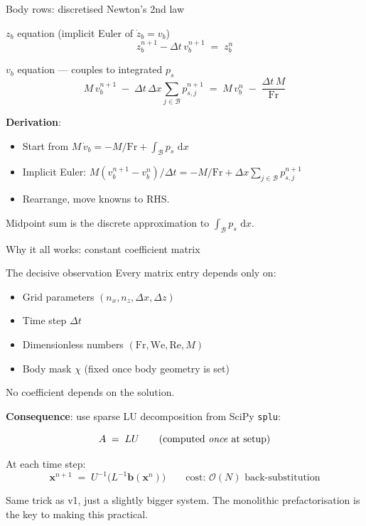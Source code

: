 \documentclass[aspectratio=169, 10pt]{beamer}
\newcommand{\Fr}{\mathrm{Fr}}
\newcommand{\We}{\mathrm{We}}
\newcommand{\Rey}{\mathrm{Re}}
\newcommand{\xx}{\mathbf{x}}
\newcommand{\bb}{\mathbf{b}}
\newcommand{\dd}{\,\mathrm{d}}
\newcommand{\Order}{\mathcal{O}}
\begin{document}
\begin{frame}{Body rows: discretised Newton's 2nd law}

\begin{block}{$z_b$ equation (implicit Euler of $\dot z_b = v_b$)}
\[
z_b^{n+1} - \Delta t\,v_b^{n+1} \;=\; z_b^n
\]
\end{block}

\vspace{0.6em}
\begin{block}{$v_b$ equation — couples to integrated $p_s$}
\[
M\,v_b^{n+1} \;-\; \Delta t\,\Delta x \sum_{j \in \mathcal{B}} p_{s,j}^{n+1} \;=\; M\,v_b^n \;-\; \frac{\Delta t\,M}{\Fr}
\]
\end{block}

\vspace{0.6em}
\textbf{Derivation}:
\begin{itemize}
\item Start from $M\,\dot v_b = -M/\Fr + \int_\mathcal{B} p_s\,\dd x$
\item Implicit Euler: $M(v_b^{n+1} - v_b^n)/\Delta t = -M/\Fr + \Delta x\sum_{j\in\mathcal{B}}p_{s,j}^{n+1}$
\item Rearrange, move knowns to RHS.
\end{itemize}

\vspace{0.3em}
\small
Midpoint sum is the discrete approximation to $\int_\mathcal{B} p_s\,\dd x$.
\end{frame}

\begin{frame}{Why it all works: constant coefficient matrix}

\begin{block}{The decisive observation}
Every matrix entry depends only on:
\begin{itemize}
    \item Grid parameters $(n_x, n_z, \Delta x, \Delta z)$
    \item Time step $\Delta t$
    \item Dimensionless numbers $(\Fr, \We, \Rey, M)$
    \item Body mask $\chi$ (fixed once body geometry is set)
\end{itemize}
\alert{No coefficient depends on the solution.}
\end{block}

\vspace{0.8em}
\textbf{Consequence}: use sparse LU decomposition from SciPy \texttt{splu}:

\[
A \;=\; L U \qquad \text{(computed \emph{once} at setup)}
\]

\vspace{0.5em}
At each time step:
\[
\xx^{n+1} \;=\; U^{-1}\big(L^{-1}\bb(\xx^n)\big) \qquad \text{cost: } \Order(N) \text{ back-substitution}
\]

\vspace{0.3em}
\small Same trick as v1, just a slightly bigger system. The monolithic prefactorisation is the key to making this practical.
\end{frame}
\end{document}
